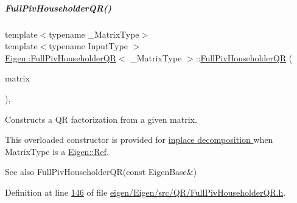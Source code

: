 \mbox{\label{group___q_r___module_ac9bdb4f7fa77c1aa16f238592c248e70}} 
\subparagraph{\texorpdfstring{Full\+Piv\+Householder\+Q\+R()}{FullPivHouseholderQR()}\hspace{0.1cm}{\footnotesize\ttfamily [4/8]}}
{\footnotesize\ttfamily template$<$typename \+\_\+\+Matrix\+Type$>$ \\
template$<$typename Input\+Type $>$ \\
\hyperlink{group___q_r___module_class_eigen_1_1_full_piv_householder_q_r}{Eigen\+::\+Full\+Piv\+Householder\+QR}$<$ \+\_\+\+Matrix\+Type $>$\+::\hyperlink{group___q_r___module_class_eigen_1_1_full_piv_householder_q_r}{Full\+Piv\+Householder\+QR} (\begin{DoxyParamCaption}\item[{\hyperlink{group___core___module_struct_eigen_1_1_eigen_base}{Eigen\+Base}$<$ Input\+Type $>$ \&}]{matrix }\end{DoxyParamCaption})\hspace{0.3cm}{\ttfamily [inline]}, {\ttfamily [explicit]}}



Constructs a QR factorization from a given matrix. 

This overloaded constructor is provided for \hyperlink{group___inplace_decomposition}{inplace decomposition } when {\ttfamily Matrix\+Type} is a \hyperlink{group___core___module_class_eigen_1_1_ref}{Eigen\+::\+Ref}.

\begin{DoxySeeAlso}{See also}
Full\+Piv\+Householder\+Q\+R(const Eigen\+Base\&) 
\end{DoxySeeAlso}


Definition at line \hyperlink{eigen_2_eigen_2src_2_q_r_2_full_piv_householder_q_r_8h_source_l00146}{146} of file \hyperlink{eigen_2_eigen_2src_2_q_r_2_full_piv_householder_q_r_8h_source}{eigen/\+Eigen/src/\+Q\+R/\+Full\+Piv\+Householder\+Q\+R.\+h}.

